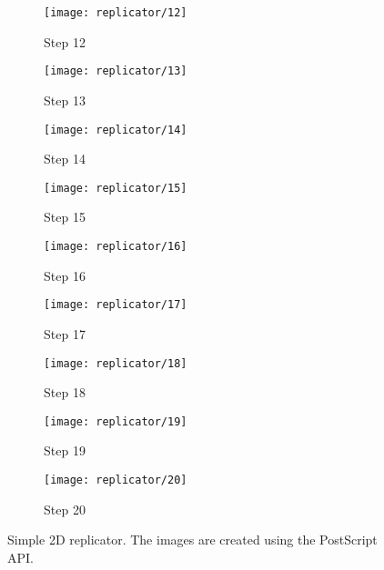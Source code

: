 \begin{figure}[!ht]
    \ContinuedFloat
    \centering
    \begin{subfigure}{0.32\textwidth}
        \centering
        \texttt{[image: replicator/12]}
        \caption{Step 12}
    \end{subfigure}
    \begin{subfigure}{0.32\textwidth}
        \centering
        \texttt{[image: replicator/13]}
        \caption{Step 13}
    \end{subfigure}
    \begin{subfigure}{0.32\textwidth}
        \centering
        \texttt{[image: replicator/14]}
        \caption{Step 14}
    \end{subfigure}
    \par\bigskip
    \begin{subfigure}{0.32\textwidth}
        \centering
        \texttt{[image: replicator/15]}
        \caption{Step 15}
    \end{subfigure}
    \begin{subfigure}{0.32\textwidth}
        \centering
        \texttt{[image: replicator/16]}
        \caption{Step 16}
    \end{subfigure}
    \begin{subfigure}{0.32\textwidth}
        \centering
        \texttt{[image: replicator/17]}
        \caption{Step 17}
    \end{subfigure}
    \par\bigskip
    \begin{subfigure}{0.32\textwidth}
        \centering
        \texttt{[image: replicator/18]}
        \caption{Step 18}
    \end{subfigure}
    \begin{subfigure}{0.32\textwidth}
        \centering
        \texttt{[image: replicator/19]}
        \caption{Step 19}
    \end{subfigure}
    \begin{subfigure}{0.32\textwidth}
        \centering
        \texttt{[image: replicator/20]}
        \caption{Step 20}
    \end{subfigure}
    \caption[Replicator] {
        Simple 2D replicator.
        The images are created using the PostScript API.
    }
    \label{fig:replicator}
\end{figure}
